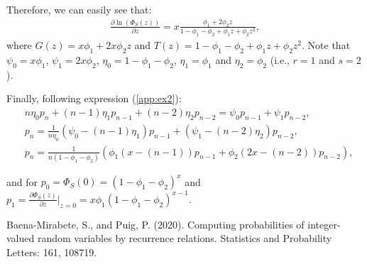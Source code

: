 \documentclass{article}
\begin{document}
Therefore, we can easily see that:
\begin{align}\label{app:ex5}
\frac{\partial \ln(\Phi_S(z))}{\partial z}=x\frac{\phi_1+2\phi_2z}{1-\phi_1-\phi_2+\phi_1z+\phi_2z^2},    
\end{align}
where $G(z)=x\phi_1+2x\phi_2z$ and $T(z)=1-\phi_1-\phi_2+\phi_1z+\phi_2z^2$. Note that $\psi_0=x\phi_1$, $\psi_1=2x\phi_2$, $\eta_0=1-\phi_1-\phi_2$, $\eta_1=\phi_1$ and $\eta_2=\phi_2$ (i.e., $r=1$ and $s=2$). 

Finally, following expression (\ref{app:ex2}):
\begin{align}
& n\eta_0p_n+(n-1)\eta_1p_{n-1}+(n-2)\eta_2p_{n-2}=\psi_0p_{n-1}+\psi_1p_{n-2}, \nonumber \\ 
& p_n=\frac{1}{n\eta_0}\left(\psi_0-(n-1)\eta_1\right)p_{n-1}+(\psi_1-(n-2)\eta_2)p_{n-2}, \nonumber \\ 
& p_n = \frac{1}{n(1-\phi_1-\phi_2)}\left(\phi_1(x-(n-1))p_{n-1}+\phi_2(2x-(n-2))p_{n-2}\right),
\end{align}

and for $p_0=\Phi_S(0)=(1-\phi_1-\phi_2)^{x}$ and $p_1=\frac{\partial \Phi_S(z)}{\partial z} \Bigg|_{z=0}=x\phi_1(1-\phi_1-\phi_2)^{x-1}$. 

\bigskip

Baena-Mirabete, S., and Puig, P. (2020). Computing probabilities of integer-valued random variables by recurrence relations. Statistics and Probability Letters: 161, 108719. 
\end{document}
